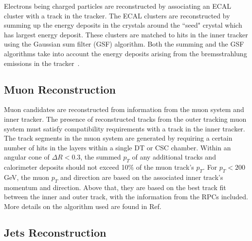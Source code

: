 Electrons being charged particles are reconstructed by associating an ECAL cluster with a track in the tracker. The ECAL clusters are reconstructed by summing up the energy deposits in the crystals around the ``seed" crystal which has largest energy deposit. These clusters are matched to hits in the inner tracker using the Gaussian sum filter (GSF) algorithm. Both the summing and the GSF algorithms take into account the energy deposits arising from the bremsstrahlung emissions in the tracker~\cite{Mukherjee:2021wzi}.


\subsection{Muon Reconstruction}

Muon candidates are reconstructed from information from the muon system and inner tracker. The presence of reconstructed tracks from the outer tracking muon system must satisfy compatibility requirements with a track in the inner tracker. The track segments in the muon system are generated by requiring a certain number of hits in the layers within a single DT or CSC chamber. Within an angular cone of $\Delta R < 0.3$, the summed $p_{T}$ of any additional tracks and calorimeter deposits should not exceed 10$\%$ of the muon track's $p_{T}$. For $p_{T} < 200$ GeV, the muon $p_{T}$ and direction are based on the associated inner track's momentum and direction. Above that, they are based on the best track fit between the inner and outer track, with the information from the RPCs included. More details on the algorithm used are found in Ref.~\cite{CMS:2018rym} 

\subsection{Jets Reconstruction}

